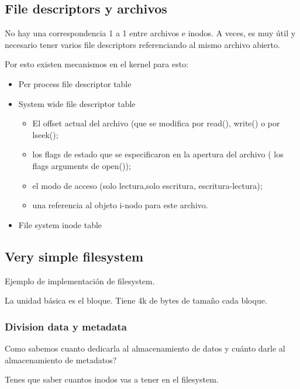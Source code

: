 \documentclass{article}
\begin{document}
\subsection{File descriptors y
archivos}\label{file-descriptors-y-archivos}

No hay una correspondencia 1 a 1 entre archivos e inodos. A veces, es
muy útil y necesario tener varios file descriptors referenciando al
mismo archivo abierto.

Por esto existen mecanismos en el kernel para esto:

\begin{itemize}
\item
  Per process file descriptor table
\item
  System wide file descriptor table

  \begin{itemize}
  \item
    El offset actual del archivo (que se modifica por read(), write() o
    por lseek();
  \item
    los flags de estado que se especificaron en la apertura del archivo
    ( los flags arguments de open());
  \item
    el modo de acceso (solo lectura,solo escritura, escritura-lectura);
  \item
    una referencia al objeto i-nodo para este archivo.
  \end{itemize}
\item
  File system inode table
\end{itemize}

\subsection{Very simple filesystem}\label{very-simple-filesystem}

Ejemplo de implementación de filesystem.

La unidad básica es el bloque. Tiene 4k de bytes de tamaño cada bloque.

\subsubsection{Division data y metadata}\label{division-data-y-metadata}

Como sabemos cuanto dedicarla al almacenamiento de datos y cuánto darle
al almacenamiento de metadatos?

Tenes que saber cuantos inodos vas a tener en el filesystem.
\end{document}
